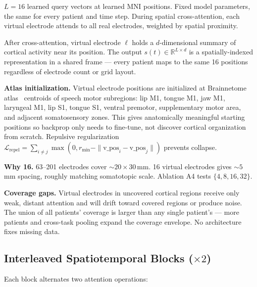 \documentclass[11pt,letterpaper]{article}
\newcommand{\R}{\mathbb{R}}
\begin{document}
$L = 16$ learned query vectors at learned MNI positions. Fixed model parameters, the same for every patient and time step. During spatial cross-attention, each virtual electrode attends to all real electrodes, weighted by spatial proximity.

After cross-attention, virtual electrode $\ell$ holds a $d$-dimensional summary of cortical activity near its position. The output $s(t) \in \R^{L \times d}$ is a spatially-indexed representation in a shared frame --- every patient maps to the same 16 positions regardless of electrode count or grid layout.

\textbf{Atlas initialization.} Virtual electrode positions are initialized at Brainnetome atlas~\cite{fan2016} centroids of speech motor subregions: lip M1, tongue M1, jaw M1, laryngeal M1, lip S1, tongue S1, ventral premotor, supplementary motor area, and adjacent somatosensory zones. This gives anatomically meaningful starting positions so backprop only needs to fine-tune, not discover cortical organization from scratch. Repulsive regularization $\mathcal{L}_{\text{repel}} = \sum_{i \neq j} \max(0, r_{\min} - \|\text{v\_pos}_i - \text{v\_pos}_j\|)$ prevents collapse.

\textbf{Why 16.} 63--201 electrodes cover ${\sim}20 \times 30$\,mm. 16 virtual electrodes gives ${\sim}5$\,mm spacing, roughly matching somatotopic scale. Ablation A4 tests $\{4, 8, 16, 32\}$.

\textbf{Coverage gaps.} Virtual electrodes in uncovered cortical regions receive only weak, distant attention and will drift toward covered regions or produce noise. The union of all patients' coverage is larger than any single patient's --- more patients and cross-task pooling expand the coverage envelope. No architecture fixes missing data.


\subsection{Interleaved Spatiotemporal Blocks ($\times 2$)}\label{sec:interleaved}

Each block alternates two attention operations:
\end{document}
